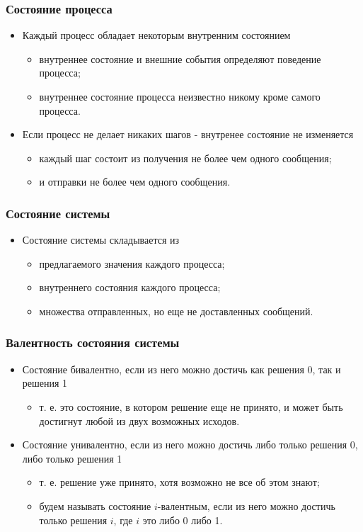 \begin{frame}
\frametitle{Состояние процесса}
\begin{itemize}
  \item Каждый процесс обладает некоторым внутренним состоянием
  \begin{itemize}
    \item внутреннее состояние и внешние события определяют поведение процесса;
    \item внутреннее состояние процесса неизвестно никому кроме самого процесса.
  \end{itemize}
  \item Если процесс не делает никаких шагов - внутренее состояние не изменяется
  \begin{itemize}
    \item каждый шаг состоит из получения не более чем одного сообщения;
    \item и отправки не более чем одного сообщения.
  \end{itemize}
\end{itemize}
\end{frame}

\begin{frame}
\frametitle{Состояние системы}
\begin{itemize}
  \item Состояние системы складывается из
  \begin{itemize}
    \item предлагаемого значения каждого процесса;
    \item внутреннего состояния каждого процесса;
    \item множества отправленных, но еще не доставленных сообщений.
  \end{itemize}
\end{itemize}
\end{frame}

\begin{frame}
\frametitle{Валентность состояния системы}
\begin{itemize}
  \item Состояние бивалентно, если из него можно достичь как решения 0, так и
  решения 1
  \begin{itemize}
    \item т. е. это состояние, в котором решение еще не принято, и может быть
    достигнут любой из двух возможных исходов.
  \end{itemize}
  \item Состояние унивалентно, если из него можно достичь либо только решения 0,
  либо только решения 1
  \begin{itemize}
    \item т. е. решение уже принято, хотя возможно не все об этом знают;
    \item будем называть состояние $i$-валентным, если из него можно достичь
    только решения $i$, где $i$ это либо 0 либо 1.
  \end{itemize}
\end{itemize}
\end{frame}

